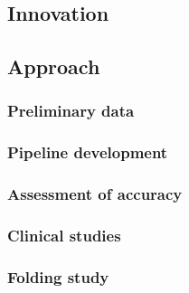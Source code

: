 \documentclass[11pt]{nih}
\begin{document}
\subsection{Innovation}



\subsection{Approach}

\subsubsection{Preliminary data}

\subsubsection{Pipeline development}

\subsubsection{Assessment of accuracy}

\subsubsection{Clinical studies}

\subsubsection{Folding study}





 

\appendix
\end{document}
